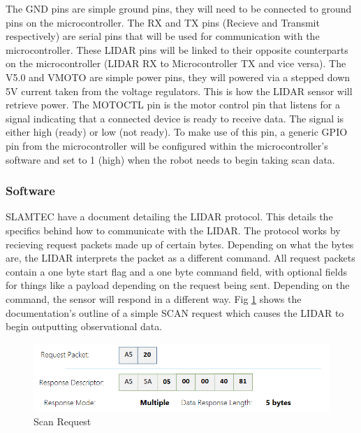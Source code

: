 				The GND pins are simple ground pins, they will need to be connected to ground pins on the microcontroller. The RX and TX pins (Recieve and Transmit respectively) are serial pins that will be used for communication with the microcontroller. These LIDAR pins will be linked to their opposite counterparts on the microcontroller (LIDAR RX to Microcontroller TX and vice versa). The V5.0 and VMOTO are simple power pins, they will powered via a stepped down 5V current taken from the voltage regulators. This is how the LIDAR sensor will retrieve power. The MOTOCTL pin is the motor control pin that listens for a signal indicating that a connected device is ready to receive data. The signal is either high (ready) or low (not ready). To make use of this pin, a generic GPIO pin from the microcontroller will be configured within the microcontroller's software and set to 1 (high) when the robot needs to begin taking scan data.
				
				\subsubsection{Software}
				\label{sec:observation:software}
				SLAMTEC have a document detailing the LIDAR protocol\citep{rplidarprotocol}. This details the specifics behind how to communicate with the LIDAR. The protocol works by recieving request packets made up of certain bytes. Depending on what the bytes are, the LIDAR interprets the packet as a different command. All request packets contain a one byte start flag and a one byte command field, with optional fields for things like a payload depending on the request being sent. Depending on the command, the sensor will respond in a different way. Fig \ref{fig:examplerequest} shows the documentation's outline of a simple SCAN request which causes the LIDAR to begin outputting observational data.
				\begin{figure}[h]
					\centering
					\includegraphics[width=.9\linewidth]{SYNTHESIS/examplerequest.png}
					\caption{Scan Request}
					\label{fig:examplerequest}
				\end{figure}
			
